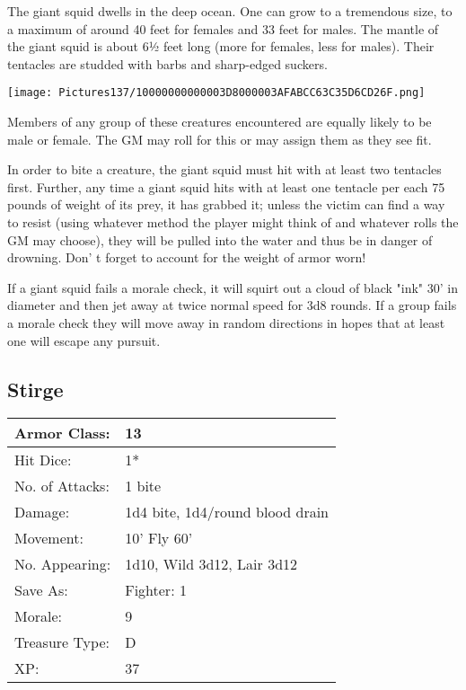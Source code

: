 \documentclass[a4paper,twoside,openany,10pt]{book}
\begin{document}
\begin{multicols}{2}
The
giant squid dwells in the deep ocean. One can grow to a tremendous size, to a maximum of around 40 feet for females and 33 feet for males. The mantle of the giant squid is about 6½ feet long (more for females, less for males). Their tentacles are studded with barbs and sharp-edged suckers.


\begin{center} \texttt{[image: Pictures137/10000000000003D8000003AFABCC63C35D6CD26F.png]} \end{center}

Members of any group of these creatures encountered are equally likely to be male or female. The GM may roll for this or may assign them as they see fit.

In order to bite a creature, the giant squid must hit with at least two tentacles first. Further, any time a giant squid hits with at least one tentacle per each 75 pounds of weight of its prey, it has grabbed it; unless the victim can find a way to resist (using whatever method the player might think of and whatever rolls the GM may choose), they will be pulled into the water and thus be in danger of drowning. Don' t forget to account for the weight of armor worn!

If a giant squid fails a morale check, it will squirt out a cloud of black "ink" 30' in diameter and then jet away at twice normal speed for 3d8 rounds. If a group fails a morale check they will move away in random directions in hopes that at least one will escape any pursuit.

\subsection*{Stirge}\label{stirge}

\begin{tabularx}{0.50\textwidth}{@{}lX@{}}
Armor Class: & 13 \\\hline
Hit Dice: & 1* \\\hline
No. of Attacks: & 1 bite \\\hline
Damage: & 1d4 bite, 1d4/round blood drain \\\hline
Movement: & 10' Fly 60' \\\hline
No. Appearing: & 1d10, Wild 3d12, Lair 3d12 \\\hline
Save As: & Fighter: 1 \\\hline
Morale: & 9 \\\hline
Treasure Type: & D \\\hline
XP: & 37 \\\hline
\end{tabularx}\medskip


\end{multicols}
\end{document}
